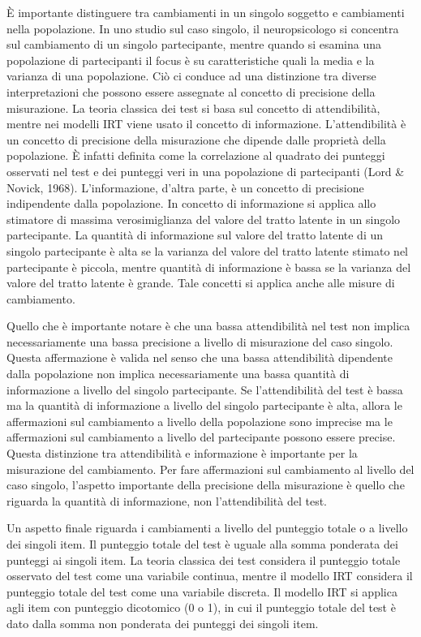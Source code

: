 \documentclass[
  11pt,
]{krantz}
\theoremstyle{definition}
\theoremstyle{definition}
\theoremstyle{definition}
\theoremstyle{definition}
\theoremstyle{remark}
\begin{document}
È importante distinguere tra cambiamenti in un singolo soggetto e cambiamenti nella popolazione. In uno studio sul caso singolo, il neuropsicologo si concentra sul cambiamento di un singolo partecipante, mentre quando si esamina una popolazione di partecipanti il focus è su caratteristiche quali la media e la varianza di una popolazione. Ciò ci conduce ad una distinzione tra diverse interpretazioni che possono essere assegnate al concetto di precisione della misurazione. La teoria classica dei test si basa sul concetto di attendibilità, mentre nei modelli IRT viene usato il concetto di informazione. L'attendibilità è un concetto di precisione della misurazione che dipende dalle proprietà della popolazione. È infatti definita come la correlazione al quadrato dei punteggi osservati nel test e dei punteggi veri in una popolazione di partecipanti (Lord \& Novick, 1968). L'informazione, d'altra parte, è un concetto di precisione indipendente dalla popolazione. In concetto di informazione si applica allo stimatore di massima verosimiglianza del valore del tratto latente in un singolo partecipante. La quantità di informazione sul valore del tratto latente di un singolo partecipante è alta se la varianza del valore del tratto latente stimato nel partecipante è piccola, mentre quantità di informazione è bassa se la varianza del valore del tratto latente è grande. Tale concetti si applica anche alle misure di cambiamento.

Quello che è importante notare è che una bassa attendibilità nel test non implica necessariamente una bassa precisione a livello di misurazione del caso singolo. Questa affermazione è valida nel senso che una bassa attendibilità dipendente dalla popolazione non implica necessariamente una bassa quantità di informazione a livello del singolo partecipante. Se l'attendibilità del test è bassa ma la quantità di informazione a livello del singolo partecipante è alta, allora le affermazioni sul cambiamento a livello della popolazione sono imprecise ma le affermazioni sul cambiamento a livello del partecipante possono essere precise. Questa distinzione tra attendibilità e informazione è importante per la misurazione del cambiamento. Per fare affermazioni sul cambiamento al livello del caso singolo, l'aspetto importante della precisione della misurazione è quello che riguarda la quantità di informazione, non l'attendibilità del test.

Un aspetto finale riguarda i cambiamenti a livello del punteggio totale o a livello dei singoli item. Il punteggio totale del test è uguale alla somma ponderata dei punteggi ai singoli item. La teoria classica dei test considera il punteggio totale osservato del test come una variabile continua, mentre il modello IRT considera il punteggio totale del test come una variabile discreta. Il modello IRT si applica agli item con punteggio dicotomico (0 o 1), in cui il punteggio totale del test è dato dalla somma non ponderata dei punteggi dei singoli item.
\end{document}
